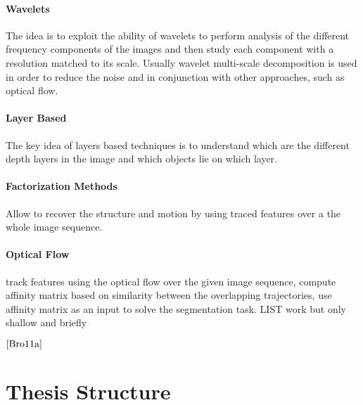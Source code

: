 \paragraph{Wavelets}
The idea is to exploit the ability of wavelets to perform analysis of the different frequency components of the images and then study each component with a resolution matched to its scale. Usually wavelet multi-scale decomposition is used in order to reduce the noise and in conjunction with other approaches, such as optical flow.

\paragraph{Layer Based} The key idea of layers based techniques is to understand which are the different depth layers in the image and which objects lie on which layer. 

\paragraph{Factorization Methods} Allow to recover the structure and motion by using traced features over a the whole image sequence.

\paragraph{Optical Flow}
track features using the optical flow over the given image sequence, compute affinity matrix based on similarity between the overlapping trajectories, use affinity matrix as an input to solve the segmentation task. LIST work but only shallow and briefly

$\cite{Bro11a}$

\section{Thesis Structure}

